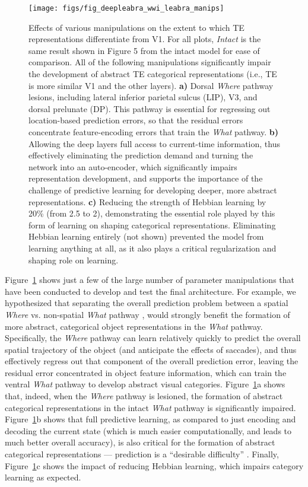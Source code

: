 \documentclass[11pt,twoside]{article}
\newif\myifpdf
\begin{document}
\begin{figure}
  \centering\texttt{[image: figs/fig\_deepleabra\_wwi\_leabra\_manips]}
  \caption{Effects of various manipulations on the extent to which TE representations differentiate from V1.  For all plots, \emph{Intact} is the same result shown in Figure 5 from the intact model for ease of comparison.  All of the following  manipulations significantly impair the development of abstract TE categorical representations (i.e., TE is more similar V1 and the other layers).  {\bf a)} Dorsal \emph{Where} pathway lesions, including lateral inferior parietal sulcus (LIP), V3, and dorsal prelunate (DP).  This pathway is essential for regressing out location-based prediction errors, so that the residual errors concentrate feature-encoding errors that train the \emph{What} pathway.  {\bf b)} Allowing the deep layers full access to current-time information, thus effectively eliminating the prediction demand and turning the network into an auto-encoder, which significantly impairs representation development, and supports the importance of the challenge of predictive learning for developing deeper, more abstract representations.  {\bf c)} Reducing the strength of Hebbian learning by 20\% (from 2.5 to 2), demonstrating the essential role played by this form of learning on shaping categorical representations.  Eliminating Hebbian learning entirely (not shown) prevented the model from learning anything at all, as it also plays a critical regularization and shaping role on learning.}
  \label{fig.manips}
\end{figure}

Figure~\ref{fig.manips} shows just a few of the large number of parameter manipulations that have been conducted to develop and test the final architecture.  For example, we hypothesized that separating the overall prediction problem between a spatial \emph{Where} vs. non-spatial \emph{What} pathway \cite{UngerleiderMishkin82,GoodaleMilner92}, would strongly benefit the formation of more abstract, categorical object representations in the \emph{What} pathway.  Specifically, the \emph{Where} pathway can learn relatively quickly to predict the overall spatial trajectory of the object (and anticipate the effects of saccades), and thus effectively regress out that component of the overall prediction error, leaving the residual error concentrated in object feature information, which can train the ventral \emph{What} pathway to develop abstract visual categories.  Figure~\ref{fig.manips}a shows that, indeed, when the \emph{Where} pathway is lesioned, the formation of abstract categorical representations in the intact \emph{What} pathway is significantly impaired.  Figure~\ref{fig.manips}b shows that full predictive learning, as compared to just encoding and decoding the current state (which is much easier computationally, and leads to much better overall accuracy), is also critical for the formation of abstract categorical representations --- prediction is a ``desirable difficulty'' \cite{Bjork94}.  Finally, Figure~\ref{fig.manips}c shows the impact of reducing Hebbian learning, which impairs category learning as expected.
\end{document}
